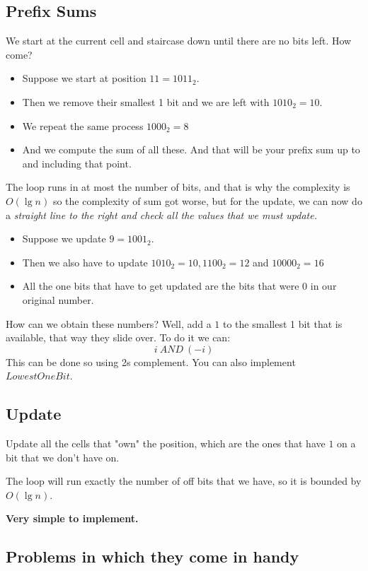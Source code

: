 \documentclass{IEEEtran}
\begin{document}
    \subsection{Prefix Sums}
      We start at the current cell and staircase down until there are no bits left. How come?
      \begin{itemize}
        \item Suppose we start at position $11 = 1011_2$.
        \item Then we remove their smallest 1 bit and we are left with $1010_2 = 10$.
        \item We repeat the same process $1000_2=8$
        \item And we compute the sum of all these. And that will be your prefix sum up to and including that point. 
      \end{itemize}
      \par The loop runs in at most the number of bits, and that is why the complexity is $O(\lg{n})$ so the complexity of sum got worse, but for the update, we can now do a \textit{straight line to the right and check all the values that we must update.}
      \begin{itemize}
        \item Suppose we update $9 = 1001_2$.
        \item Then we also have to update $1010_2 =10, 1100_2 = 12$ and $10000_2=16$
        \item All the one bits that have to get updated are the bits that were 0 in our original number.
      \end{itemize}
      \par How can we obtain these numbers? Well, add a $1$ to the smallest 1 bit that is available, that way they slide over. To do it we can:
      $$i\ AND\ (-i)$$
      This can be done so using 2s complement. You can also implement $LowestOneBit$.
    \subsection{Update}
      Update all the cells that "own" the position, which are the ones that have $1$ on a bit that we don't have on.\par
      The loop will run exactly the number of off bits that we have, so it is bounded by $O(\lg{n})$.\par
      \textbf{Very simple to implement.}
    \subsection{Problems in which they come in handy}
\end{document}
